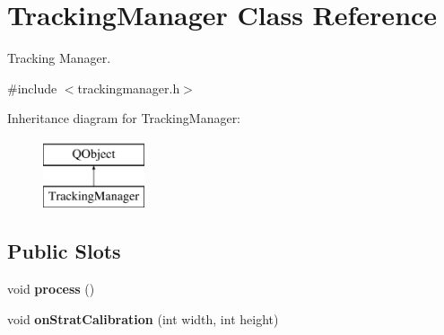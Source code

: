 \hypertarget{classTrackingManager}{}\section{Tracking\+Manager Class Reference}
\label{classTrackingManager}


Tracking Manager.  




{\ttfamily \#include $<$trackingmanager.\+h$>$}

Inheritance diagram for Tracking\+Manager\+:\begin{figure}[H]
\begin{center}
\leavevmode
\includegraphics[height=2.000000cm]{classTrackingManager}
\end{center}
\end{figure}
\subsection*{Public Slots}
\begin{DoxyCompactItemize}
\item 
\hypertarget{classTrackingManager_ae2b8f75dfa34ecfd2f3039f030ee7fa5}{}void {\bfseries process} ()\label{classTrackingManager_ae2b8f75dfa34ecfd2f3039f030ee7fa5}

\item 
\hypertarget{classTrackingManager_a211f31126e88c1643c57fba01bbcadee}{}void {\bfseries on\+Strat\+Calibration} (int width, int height)\label{classTrackingManager_a211f31126e88c1643c57fba01bbcadee}

\end{DoxyCompactItemize}
